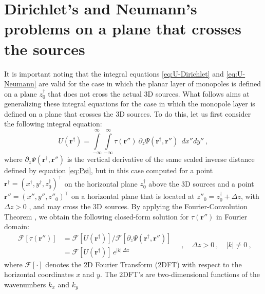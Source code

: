 \section{Dirichlet's and Neumann's problems on a plane that crosses the sources}
\label{sec:generalized_dirichlet_neumann}


It is important noting that the integral equations \ref{eq:U-Dirichlet} and 
\ref{eq:U-Neumann} are valid for the case in which the planar layer of monopoles
is defined on a plane $z^{\dagger}_{0}$ that does not cross the actual 3D sources. 
What follows aims at generalizing these integral equations for the case in which the 
monopole layer is defined on a plane that crosses the 3D sources.
To do this, let us first consider the following integral equation:
\begin{equation}
	U(\mathbf{r}^{\dagger}) = 
	\int\limits_{-\infty}^{\infty} \int\limits_{-\infty}^{\infty}
	\tau(\mathbf{r}'') \:
	\partial_{z} \Psi(\mathbf{r}^{\dagger}, \mathbf{r}'') 
	\:\: dx''dy'' \: ,
	\label{eq:U-tau}
\end{equation}
where $\partial_{z} \Psi(\mathbf{r}^{\dagger}, \mathbf{r}'')$ is the vertical
derivative of the same scaled inverse distance
defined by equation \ref{eq:Psi}, but in this case computed for a point
$\mathbf{r}^{\dagger} = (x^{\dagger}, y^{\dagger}, z^{\dagger}_{0})^{\top}$ on the
horizontal plane $z^{\dagger}_{0}$ above the 3D sources and a point 
$\mathbf{r}'' = (x'', y'', z''_{0})^{\top}$ 
on a horizontal plane that is located at $z''_{0} = z^{\dagger}_{0} + \Delta z$, 
with $\Delta z > 0$ , and may cross the 3D sources.
By applying the Fourier-Convolution Theorem \cite[][ p. 268]{blakely1996},
we obtain the following closed-form solution for $\tau(\mathbf{r}'')$ in Fourier domain:
\begin{equation}
	\begin{split}
		\mathcal{F} \left[ \tau(\mathbf{r}'') \right] 
		&= \mathcal{F} \left[ U(\mathbf{r}^{\dagger}) \right] {\Big /}
		\mathcal{F} \left[ \partial_{z} \Psi(\mathbf{r}^{\dagger}, \mathbf{r}'') \right] \\
		&= \mathcal{F} \left[ U(\mathbf{r}^{\dagger}) \right] 
		\, e^{\vert k \vert \, \Delta z}
	\end{split} \quad , \quad \Delta z > 0 \: , \quad \vert k \vert \ne 0 \: ,
	\label{eq:Fourier-U-tau}
\end{equation}
where $\mathcal{F}\left[ \cdot \right]$ denotes the 2D Fourier Transform (2DFT)
with respect to the horizontal coordinates $x$ and $y$.
The 2DFT's are two-dimensional functions of the wavenumbers $k_{x}$ and $k_{y}$ 
